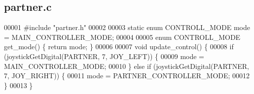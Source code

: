 \subsection{partner.\+c}
\label{a00137_source}

\begin{DoxyCode}
00001 \textcolor{preprocessor}{#include "partner.h"}
00002 
00003 \textcolor{keyword}{static} \textcolor{keyword}{enum} CONTROLL_MODE mode = MAIN_CONTROLLER_MODE;
00004 
00005 \textcolor{keyword}{enum} CONTROLL_MODE get_mode() \{ \textcolor{keywordflow}{return} mode; \}
00006 
00007 \textcolor{keywordtype}{void} update_control() \{
00008   \textcolor{keywordflow}{if} (joystickGetDigital(PARTNER, 7, JOY\_LEFT)) \{
00009     mode = MAIN_CONTROLLER_MODE;
00010   \} \textcolor{keywordflow}{else} \textcolor{keywordflow}{if} (joystickGetDigital(PARTNER, 7, JOY\_RIGHT)) \{
00011     mode = PARTNER_CONTROLLER_MODE;
00012   \}
00013 \}
\end{DoxyCode}
